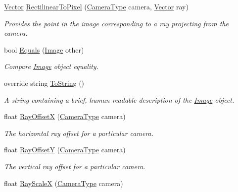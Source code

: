 \begin{DoxyCompactItemize}
\mbox{\hyperlink{struct_leap_1_1_vector}{Vector}} \mbox{\hyperlink{class_leap_1_1_image_ab2cb673a34f6fc61e504748887a8f144}{Rectilinear\+To\+Pixel}} (\mbox{\hyperlink{class_leap_1_1_image_a28310e43e0f2d7f7117e1b45330bdc38}{Camera\+Type}} camera, \mbox{\hyperlink{struct_leap_1_1_vector}{Vector}} ray)
\begin{DoxyCompactList}\small\item\em Provides the point in the image corresponding to a ray projecting from the camera. \end{DoxyCompactList}\item 
bool \mbox{\hyperlink{class_leap_1_1_image_aa0f9ff65ecf4c3902ba9496fb57d2f81}{Equals}} (\mbox{\hyperlink{class_leap_1_1_image}{Image}} other)
\begin{DoxyCompactList}\small\item\em Compare \mbox{\hyperlink{class_leap_1_1_image}{Image}} object equality. \end{DoxyCompactList}\item 
override string \mbox{\hyperlink{class_leap_1_1_image_a0f052fc6d7936be1b055f5283756cc38}{To\+String}} ()
\begin{DoxyCompactList}\small\item\em A string containing a brief, human readable description of the \mbox{\hyperlink{class_leap_1_1_image}{Image}} object. \end{DoxyCompactList}\item 
float \mbox{\hyperlink{class_leap_1_1_image_aefd21949a969ba875fad9af1fa1c6158}{Ray\+OffsetX}} (\mbox{\hyperlink{class_leap_1_1_image_a28310e43e0f2d7f7117e1b45330bdc38}{Camera\+Type}} camera)
\begin{DoxyCompactList}\small\item\em The horizontal ray offset for a particular camera. \end{DoxyCompactList}\item 
float \mbox{\hyperlink{class_leap_1_1_image_a2cca6b718a6ef06bb2da024abaec9ee9}{Ray\+OffsetY}} (\mbox{\hyperlink{class_leap_1_1_image_a28310e43e0f2d7f7117e1b45330bdc38}{Camera\+Type}} camera)
\begin{DoxyCompactList}\small\item\em The vertical ray offset for a particular camera. \end{DoxyCompactList}\item 
float \mbox{\hyperlink{class_leap_1_1_image_a30e614bb33154b1f3e7536a502811278}{Ray\+ScaleX}} (\mbox{\hyperlink{class_leap_1_1_image_a28310e43e0f2d7f7117e1b45330bdc38}{Camera\+Type}} camera)

\end{DoxyCompactItemize}
